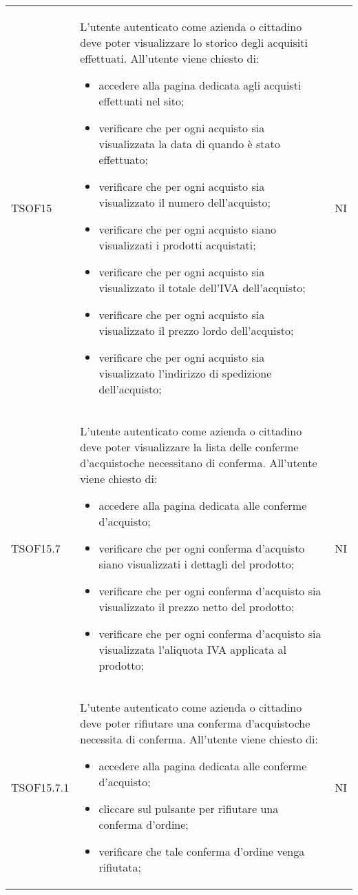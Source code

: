 \begin{longtable}{ >{\centering}p{} >{\centering}p{}
			>{\centering}p{}}
		TSOF15	&	L'utente autenticato come azienda o cittadino deve poter visualizzare lo
		storico degli acquisiti effettuati. All'utente viene chiesto di:
		\begin{itemize}
			\item accedere alla pagina dedicata agli acquisti effettuati nel sito;
			\item verificare che per ogni acquisto sia visualizzata la data di quando
			è stato effettuato;
			\item verificare che per ogni acquisto sia visualizzato il numero
			dell'acquisto;
			\item verificare che per ogni acquisto siano visualizzati i prodotti
			acquistati;
			\item verificare che per ogni acquisto sia visualizzato il totale dell'IVA
			dell'acquisto;
			\item verificare che per ogni acquisto sia visualizzato il prezzo
			lordo\glo{} dell'acquisto;
			\item verificare che per ogni acquisto sia visualizzato l'indirizzo di 
			spedizione dell'acquisto;
		\end{itemize}	&	NI
		\tabularnewline
		
		TSOF15.7	&	L'utente autenticato come azienda o cittadino deve poter visualizzare la lista delle conferme d’acquisto\glosp che necessitano
		di conferma. All'utente viene chiesto di:
		\begin{itemize}
			\item accedere alla pagina dedicata alle conferme d'acquisto;
			\item verificare che per ogni conferma d'acquisto siano visualizzati i dettagli del prodotto;
			\item verificare che per ogni conferma d'acquisto sia visualizzato il prezzo netto del prodotto;
			\item verificare che per ogni conferma d'acquisto sia visualizzata l'aliquota IVA applicata al prodotto;
		\end{itemize}	&	NI
		\tabularnewline
		
		TSOF15.7.1	&	L'utente autenticato come azienda o cittadino deve poter rifiutare una conferma d’acquisto\glosp che necessita
		di conferma. All'utente viene chiesto di:
		\begin{itemize}
			\item accedere alla pagina dedicata alle conferme d'acquisto;
			\item cliccare sul pulsante per rifiutare una conferma d'ordine;
			\item verificare che tale conferma d'ordine venga rifiutata;
		\end{itemize}	&	NI
		\tabularnewline
		

\end{longtable}
